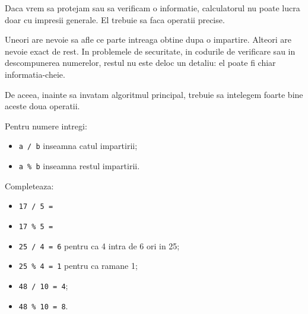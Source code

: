 
\begin{missionbox}
  Daca vrem sa protejam sau sa verificam o informatie, calculatorul nu poate lucra doar cu impresii generale. El trebuie sa faca operatii precise.

  Uneori are nevoie sa afle ce parte intreaga obtine dupa o impartire. Alteori are nevoie exact de rest. In problemele de securitate, in codurile de verificare sau in descompunerea numerelor, restul nu este deloc un detaliu: el poate fi chiar informatia-cheie.

  De aceea, inainte sa invatam algoritmul principal, trebuie sa intelegem foarte bine aceste doua operatii.
\end{missionbox}

\begin{conceptbox}
  Pentru numere intregi:
  \begin{itemize}
    \item \texttt{a / b} inseamna catul impartirii;
    \item \texttt{a \% b} inseamna restul impartirii.
  \end{itemize}
\end{conceptbox}

\begin{guidebox}
  Completeaza:
  \begin{itemize}
    \item \texttt{17 / 5 =} \hrulefill
    \item \texttt{17 \% 5 =} \hrulefill
  \end{itemize}
\end{guidebox}

\newpage
{}

\begin{examplebox}
  \begin{itemize}
    \item \texttt{25 / 4 = 6} pentru ca 4 intra de 6 ori in 25;
    \item \texttt{25 \% 4 = 1} pentru ca ramane 1;
    \item \texttt{48 / 10 = 4};
    \item \texttt{48 \% 10 = 8}.
  \end{itemize}
\end{examplebox}

